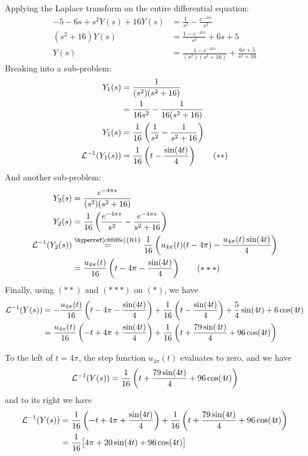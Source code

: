 Applying the Laplace transform on the entire differential equation:
\begin{align*}
	-5-6s+s^2Y(s)+16Y(s) & = \frac1{s^2}-\frac{e^{-4\pi s}}{s^2}                                 \\
	(s^2+16)Y(s)         & = \frac{1-e^{-4\pi s}}{s^2}+6s+5                                      \\
	Y(s)                 & = \frac{1-e^{-4\pi s}}{(s^2)(s^2+16)}+\frac{6s+5}{s^2+16}\tag*{($*$)}
\end{align*}
Breaking into a sub-problem:
\begin{align*}
	Y_1(s)      & =\frac1{(s^2)(s^2+16)}                                      \\
	            & =\frac{1}{16s^2}-\frac{1}{16(s^2+16)}                       \\
	Y_1(s)      & =\frac{1}{16}\left(\frac{1}{s^2}-\frac{1}{s^2+16}\right)    \\
	\mathcal L^{-1}(Y_1(s)) & =\frac{1}{16}\left(t-\frac{\sin(4t)}{4}\right)\tag*{($**$)}
\end{align*}
And another sub-problem:
\begin{align*}
	Y_2(s)      & =\frac{e^{-4\pi s}}{(s^2)(s^2+16)}                                                                                     \\
	Y_2(s)      & =\frac{1}{16}\left(\frac{e^{-4\pi s}}{s^2}-\frac{e^{-4\pi s}}{s^2+16}\right)                                           \\
	\LI(Y_2(s)) & \stackrel{\text{\hyperref[c8f0f6e]{R1}}}{=}\frac{1}{16}\left(u_{4\pi}(t)(t-4\pi)-\frac{u_{4\pi}(t)\sin(4t)}{4}\right) \\
	            & =\frac{u_{4\pi}(t)}{16}\left(t-4\pi-\frac{\sin(4t)}{4}\right)\tag*{($***$)}
\end{align*}
Finally, using $(**)$ and $(***)$ on $(*)$, we have
\begin{align*}
	\mathcal L^{-1}(Y(s))
	 & = -\frac{u_{4\pi}(t)}{16}\left(t-4\pi-\frac{\sin(4t)}{4}\right)+
	\frac{1}{16}\left(t-\frac{\sin(4t)}{4}\right)+
	\frac54\sin(4t)+6\cos(4t)                                           \\
	 & = \frac{u_{4\pi}(t)}{16}\left(-t+4\pi+\frac{\sin(4t)}{4}\right)+
	\frac{1}{16}\left(t+\frac{79\sin(4t)}{4}+96\cos(4t)\right)
\end{align*}

To the left of $t=4\pi$, the step function $u_{4\pi}(t)$ evaluates to
zero, and we have
$$
	\mathcal L^{-1}(Y(s))=\frac{1}{16}\left(t+\frac{79\sin(4t)}{4}+96\cos(4t)\right)
$$
and to its right we have
\begin{align*}
	\mathcal L^{-1}(Y(s))
	 & = \frac{1}{16}\left(-t+4\pi+\frac{\sin(4t)}{4}\right)+
	\frac{1}{16}\left(t+\frac{79\sin(4t)}{4}+96\cos(4t)\right) \\
	 & =\frac{1}{16}\big[4\pi+20\sin(4t)+96\cos(4t)\big]       \\
\end{align*}

